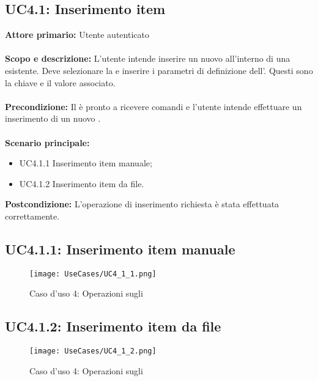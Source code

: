 \documentclass{scalatekids-article}
\begin{document}
\subsection{UC4.1: Inserimento item}

\textbf{Attore primario:} Utente autenticato\\ \\
\textbf{Scopo e descrizione:} L'utente intende inserire un nuovo  all'interno di una  esistente. Deve selezionare la  e inserire i parametri di definizione dell'. Questi sono la chiave e il valore associato.\\ \\
\textbf{Precondizione:} Il  è pronto a ricevere comandi e l'utente intende effettuare un inserimento di un nuovo .\\ \\
\textbf{Scenario principale:}
\begin{itemize}
\item UC4.1.1 Inserimento item manuale;
\item UC4.1.2 Inserimento item da file.
\end{itemize}
\textbf{Postcondizione:} L'operazione di inserimento richiesta è stata effettuata correttamente.

\subsection{UC4.1.1: Inserimento item manuale}

\begin{figure}[H]
  \begin{center}
    \texttt{[image: UseCases/UC4\_1\_1.png]}
    \caption*{Caso d'uso 4: Operazioni sugli }
  \end{center}
\end{figure}

\subsection{UC4.1.2: Inserimento item da file}

\begin{figure}[H]
  \begin{center}
    \texttt{[image: UseCases/UC4\_1\_2.png]}
    \caption*{Caso d'uso 4: Operazioni sugli }
  \end{center}
\end{figure}
\end{document}
